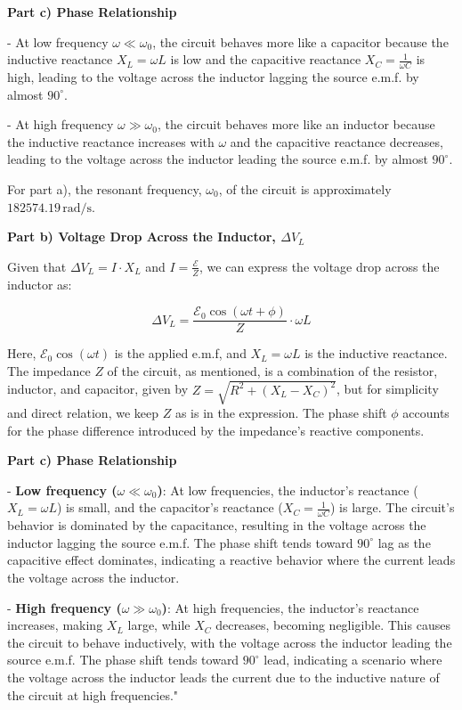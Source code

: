 \textbf{Part c) Phase Relationship}

- At low frequency \(\omega \ll \omega_{0}\), the circuit behaves more like a capacitor because the inductive reactance \(X_{L} = \omega L\) is low and the capacitive reactance \(X_{C} = \frac{1}{\omega C}\) is high, leading to the voltage across the inductor lagging the source e.m.f. by almost \(90^\circ\).

- At high frequency \(\omega \gg \omega_{0}\), the circuit behaves more like an inductor because the inductive reactance increases with \(\omega\) and the capacitive reactance decreases, leading to the voltage across the inductor leading the source e.m.f. by almost \(90^\circ\).

For part a), the resonant frequency, \( \omega_{0} \), of the circuit is approximately \( 182574.19 \, \text{rad/s} \).

\textbf{Part b) Voltage Drop Across the Inductor, \( \Delta V_{L} \)}

Given that \( \Delta V_{L} = I \cdot X_{L} \) and \( I = \frac{\mathcal{E}}{Z} \), we can express the voltage drop across the inductor as:

\[
\Delta V_{L} = \frac{\mathcal{E}_{0} \cos(\omega t + \phi)}{Z} \cdot \omega L
\]

Here, \(\mathcal{E}_{0} \cos(\omega t)\) is the applied e.m.f, and \(X_{L} = \omega L\) is the inductive reactance. The impedance \(Z\) of the circuit, as mentioned, is a combination of the resistor, inductor, and capacitor, given by \(Z = \sqrt{R^2 + (X_{L} - X_{C})^2}\), but for simplicity and direct relation, we keep \(Z\) as is in the expression. The phase shift \( \phi \) accounts for the phase difference introduced by the impedance's reactive components.

\textbf{Part c) Phase Relationship}

- \textbf{Low frequency (\( \omega \ll \omega_{0} \))}: At low frequencies, the inductor's reactance (\(X_{L} = \omega L\)) is small, and the capacitor's reactance (\(X_{C} = \frac{1}{\omega C}\)) is large. The circuit's behavior is dominated by the capacitance, resulting in the voltage across the inductor lagging the source e.m.f. The phase shift tends toward \(90^\circ\) lag as the capacitive effect dominates, indicating a reactive behavior where the current leads the voltage across the inductor.

- \textbf{High frequency (\( \omega \gg \omega_{0} \))}: At high frequencies, the inductor's reactance increases, making \(X_{L}\) large, while \(X_{C}\) decreases, becoming negligible. This causes the circuit to behave inductively, with the voltage across the inductor leading the source e.m.f. The phase shift tends toward \(90^\circ\) lead, indicating a scenario where the voltage across the inductor leads the current due to the inductive nature of the circuit at high frequencies."

